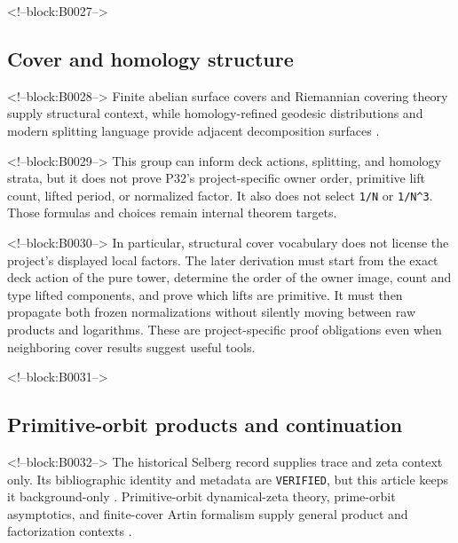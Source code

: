 \documentclass[11pt]{article}
\begin{document}
<!--block:B0027-->
\hypertarget{22-cover-and-homology-structure}{%
\subsection{Cover and homology
structure}\label{22-cover-and-homology-structure}}

<!--block:B0028-->
Finite abelian surface covers and Riemannian covering theory supply
structural context, while homology-refined geodesic distributions and
modern splitting language provide adjacent decomposition surfaces
\citep{P32-S07,P32-S08,P32-S09,P32-S10,P32-S11,P32-S12}.

<!--block:B0029-->
This group can inform deck actions, splitting, and homology strata, but
it does not prove P32's project-specific owner order, primitive lift
count, lifted period, or normalized factor. It also does not select
\texttt{1/N} or \texttt{1/N\^{}3}. Those formulas and choices remain
internal theorem targets.

<!--block:B0030-->
In particular, structural cover vocabulary does not license the
project's displayed local factors. The later derivation must start from
the exact deck action of the pure tower, determine the order of the
owner image, count and type lifted components, and prove which lifts are
primitive. It must then propagate both frozen normalizations without
silently moving between raw products and logarithms. These are
project-specific proof obligations even when neighboring cover results
suggest useful tools.

<!--block:B0031-->
\hypertarget{23-primitive-orbit-products-and-continuation}{%
\subsection{Primitive-orbit products and
continuation}\label{23-primitive-orbit-products-and-continuation}}

<!--block:B0032-->
The historical Selberg record supplies trace and zeta context only. Its
bibliographic identity and metadata are \texttt{VERIFIED}, but this
article keeps it background-only
\citep{P32-S13}.
Primitive-orbit dynamical-zeta theory, prime-orbit asymptotics, and
finite-cover Artin formalism supply general product and factorization
contexts
\citep{P32-S14,P32-S15,P32-S16}.
\end{document}
